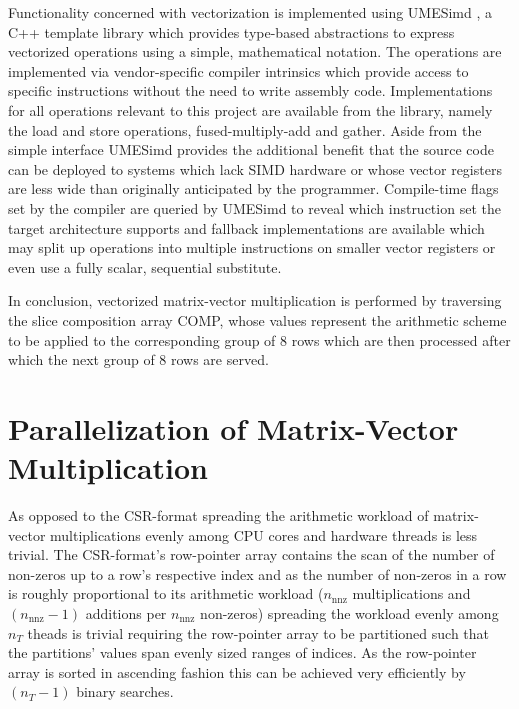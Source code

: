       Functionality concerned with vectorization is implemented using UMESimd \cite{umesimd2017}, a C++ template library
      which provides type-based abstractions to express vectorized operations using a simple, mathematical notation. The
      operations are implemented via vendor-specific compiler intrinsics which provide access to specific instructions
      without the need to write assembly code. Implementations for all operations relevant to this project are available
      from the library, namely the load and store operations, fused-multiply-add and gather. Aside from the simple
      interface UMESimd provides the additional benefit that the source code can be deployed to systems which lack SIMD
      hardware or whose vector registers are less wide than originally anticipated by the programmer. Compile-time flags
      set by the compiler are queried by UMESimd to reveal which instruction set the target architecture supports and
      fallback implementations are available which may split up operations into multiple instructions on smaller vector
      registers or even use a fully scalar, sequential substitute.

      In conclusion, vectorized matrix-vector multiplication is performed by traversing the slice composition array
      COMP, whose values represent the arithmetic scheme to be applied to the corresponding group of $8$ rows which are
      then processed after which the next group of $8$ rows are served.




    \section{Parallelization of Matrix-Vector Multiplication}

      As opposed to the CSR-format spreading the arithmetic workload of matrix-vector multiplications evenly among CPU
      cores and hardware threads is less trivial. The CSR-format's row-pointer array contains the scan of the number of
      non-zeros up to a row's respective index and as the number of non-zeros in a row is roughly proportional to its
      arithmetic workload ($n_\text{nnz}$ multiplications and $(n_\text{nnz} - 1)$ additions per $n_\text{nnz}$
      non-zeros) spreading the workload evenly among $n_T$ theads is trivial requiring the row-pointer array to be
      partitioned such that the partitions' values span evenly sized ranges of indices. As the row-pointer array is
      sorted in ascending fashion this can be achieved very efficiently by $(n_T - 1)$ binary searches.

